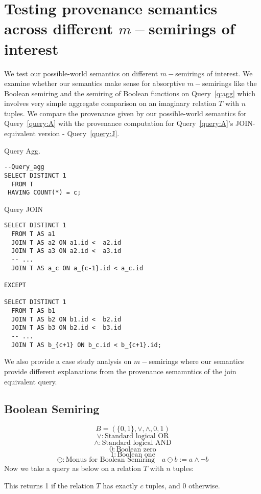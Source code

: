 \section{Testing provenance semantics across different $m-$semirings of interest}

We test our possible-world semantics on different $m-$semirings of interest. We examine whether our semantics make 
sense for absorptive $m-$semirings like the Boolean semiring and the semiring of Boolean functions on Query~\ref{q:agg} which involves very simple aggregate comparison on an imaginary relation $T$ with 
$n$ tuples. We compare the provenance given by our possible-world 
semantics for Query~\ref{query:A} with the provenance computation for Query~\ref{query:A}'s \textsc{JOIN}-equivalent version - Query~\ref{query:J}.   
\begin{listing}[h!]
  \caption{Query Agg.}
\label{query:A}
  \begin{verbatim}
--Query_agg
SELECT DISTINCT 1
  FROM T
 HAVING COUNT(*) = c;
\end{verbatim}
\end{listing}
\begin{listing}[h!]
  \caption{Query JOIN}
\label{query:J}
\begin{verbatim}
SELECT DISTINCT 1
  FROM T AS a1
  JOIN T AS a2 ON a1.id <  a2.id
  JOIN T AS a3 ON a2.id <  a3.id
  -- ...
  JOIN T AS a_c ON a_{c-1}.id < a_c.id

EXCEPT

SELECT DISTINCT 1
  FROM T AS b1
  JOIN T AS b2 ON b1.id <  b2.id
  JOIN T AS b3 ON b2.id <  b3.id
  -- ...
  JOIN T AS b_{c+1} ON b_c.id < b_{c+1}.id;
\end{verbatim}
\end{listing}
We also provide a case study analysis on $m-$semirings where our semantics 
provide different explanations from the provenance semamntics of the join equivalent query.
\subsection{Boolean Semiring}
$$B = (\{0,1\}, \lor, \land, 0, 1)$$
$$\lor : \text{Standard logical OR}$$
$$\land : \text{Standard logical AND}$$
$$0 : \text{Boolean zero}$$
$$1 : \text{Boolean one}$$
\[
\ominus: \text{Monus for Boolean Semiring} \quad a \ominus b := a \land \neg b
\]
Now we take a query as below on a relation $T$ with $n$ tuples:

This returns 1 if the relation $T$ has exactly $c$ tuples, and 0 otherwise.

